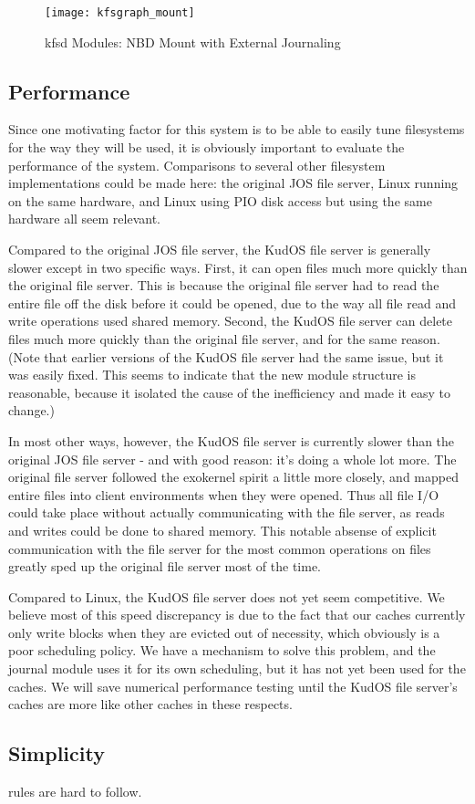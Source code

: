 \begin{figure}[htb]
\begin{center}
  \texttt{[image: kfsgraph\_mount]}
  \caption{kfsd Modules: NBD Mount with External Journaling}
  \label{fig:kfsgraph-mount}
\end{center}
\end{figure}


\subsection{Performance}
\label{sec:eval:performance}

Since one motivating factor for this system is to be able to easily tune
filesystems for the way they will be used, it is obviously important to evaluate
the performance of the system. Comparisons to several other filesystem
implementations could be made here: the original JOS file server, Linux running
on the same hardware, and Linux using PIO disk access but using the same
hardware all seem relevant.

Compared to the original JOS file server, the KudOS file server is generally
slower except in two specific ways. First, it can open files much more quickly
than the original file server. This is because the original file server had to
read the entire file off the disk before it could be opened, due to the way all
file read and write operations used shared memory. Second, the KudOS file server
can delete files much more quickly than the original file server, and for the
same reason. (Note that earlier versions of the KudOS file server had the same
issue, but it was easily fixed. This seems to indicate that the new module
structure is reasonable, because it isolated the cause of the inefficiency and
made it easy to change.)

In most other ways, however, the KudOS file server is currently slower than the
original JOS file server - and with good reason: it's doing a whole lot more.
The original file server followed the exokernel spirit a little more closely,
and mapped entire files into client environments when they were opened. Thus all
file I/O could take place without actually communicating with the file server,
as reads and writes could be done to shared memory. This notable absense of
explicit communication with the file server for the most common operations on
files greatly sped up the original file server most of the time.

Compared to Linux, the KudOS file server does not yet seem competitive. We
believe most of this speed discrepancy is due to the fact that our caches
currently only write blocks when they are evicted out of necessity, which
obviously is a poor scheduling policy. We have a mechanism to solve this
problem, and the journal module uses it for its own scheduling, but it has not
yet been used for the caches. We will save numerical performance testing until
the KudOS file server's caches are more like other caches in these respects.

\subsection{Simplicity}
\label{sec:eval:simplicity}

rules are hard to follow.
